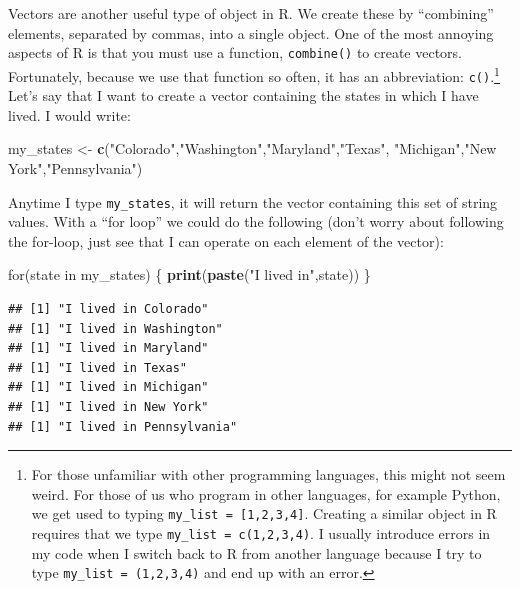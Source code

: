 \documentclass[]{article}
\newenvironment{Shaded}{\begin{snugshade}}{\end{snugshade}}
\newcommand{\KeywordTok}[1]{\textcolor[rgb]{0.13,0.29,0.53}{\textbf{{#1}}}}
\newcommand{\StringTok}[1]{\textcolor[rgb]{0.31,0.60,0.02}{{#1}}}
\newcommand{\NormalTok}[1]{{#1}}
\let\rmarkdownfootnote\footnote%
\def\footnote{\protect\rmarkdownfootnote}
\begin{document}
Vectors are another useful type of object in R. We create these by
``combining'' elements, separated by commas, into a single object. One
of the most annoying aspects of R is that you must use a function,
\texttt{combine()} to create vectors. Fortunately, because we use that
function so often, it has an abbreviation: \texttt{c()}.\footnote{For
  those unfamiliar with other programming languages, this might not seem
  weird. For those of us who program in other languages, for example
  Python, we get used to typing \texttt{my\_list\ =\ {[}1,2,3,4{]}}.
  Creating a similar object in R requires that we type
  \texttt{my\_list\ =\ c(1,2,3,4)}. I usually introduce errors in my
  code when I switch back to R from another language because I try to
  type \texttt{my\_list\ =\ (1,2,3,4)} and end up with an error.} Let's
say that I want to create a vector containing the states in which I have
lived. I would write:

\begin{Shaded}
\begin{Highlighting}[]
\NormalTok{my_states <-}\StringTok{ }\KeywordTok{c}\NormalTok{(}\StringTok{"Colorado"}\NormalTok{,}\StringTok{"Washington"}\NormalTok{,}\StringTok{"Maryland"}\NormalTok{,}\StringTok{"Texas"}\NormalTok{,}
               \StringTok{"Michigan"}\NormalTok{,}\StringTok{"New York"}\NormalTok{,}\StringTok{"Pennsylvania"}\NormalTok{)}
\end{Highlighting}
\end{Shaded}

Anytime I type \texttt{my\_states}, it will return the vector containing
this set of string values. With a ``for loop'' we could do the following
(don't worry about following the for-loop, just see that I can operate
on each element of the vector):

\begin{Shaded}
\begin{Highlighting}[]
\NormalTok{for(state in my_states) \{}
    \KeywordTok{print}\NormalTok{(}\KeywordTok{paste}\NormalTok{(}\StringTok{"I lived in"}\NormalTok{,state))}
\NormalTok{\}}
\end{Highlighting}
\end{Shaded}

\begin{verbatim}
## [1] "I lived in Colorado"
## [1] "I lived in Washington"
## [1] "I lived in Maryland"
## [1] "I lived in Texas"
## [1] "I lived in Michigan"
## [1] "I lived in New York"
## [1] "I lived in Pennsylvania"
\end{verbatim}
\end{document}
